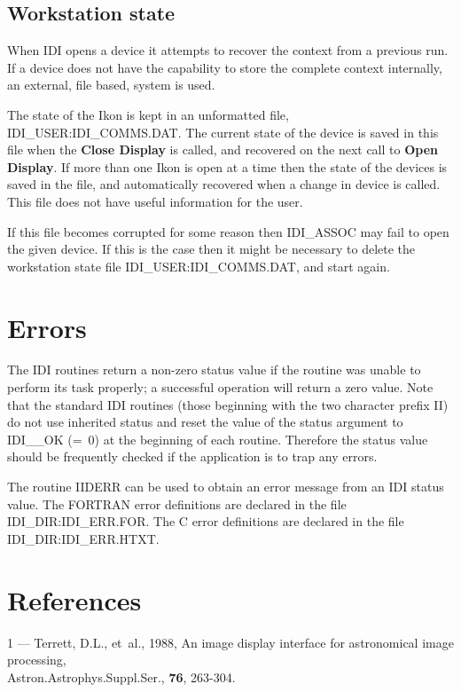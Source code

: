 \subsection{Workstation state}

When IDI opens a device it attempts to recover the context from a
previous run. If a device does not have the capability to store the
complete context internally, an external, file based, system is used.

The state of the Ikon is kept in an unformatted file,
IDI\_USER:IDI\_COMMS.DAT. The current state of the device is saved in
this file when the {\bf Close Display} is called, and recovered on the
next call to {\bf Open Display}. If more than one Ikon is open at a
time then the state of the devices is saved in the file, and automatically
recovered when a change in device is called. This file does not have
useful information for the user.

If this file becomes corrupted for some reason then IDI\_ASSOC may fail
to open the given device. If this is the case then it might be necessary
to delete the workstation state file IDI\_USER:IDI\_COMMS.DAT, and start
again.

\section{Errors}

The IDI routines return a non-zero status value if the routine was
unable to perform its task properly; a successful operation will return
a zero value. Note that the standard IDI routines (those beginning with
the two character prefix II) do not use inherited status and reset the
value of the status argument to IDI\_\_OK (=~0) at the beginning of each
routine. Therefore the status value should be frequently checked if the
application is to trap any errors.

The routine IIDERR can be used to obtain an error message from an
IDI status value. The FORTRAN error definitions are declared in the
file IDI\_DIR:IDI\_ERR.FOR. The C error definitions are declared in
the file IDI\_DIR:IDI\_ERR.HTXT.

\section{References}

1 --- Terrett, D.L., et~al., 1988, An image display interface for
astronomical image processing, \\
\hspace*{1.5em} Astron.Astrophys.Suppl.Ser., {\bf 76}, 263-304.

